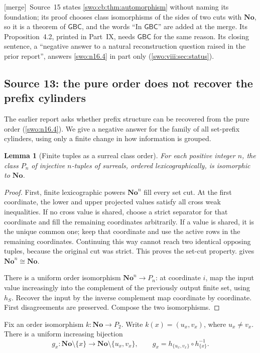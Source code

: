 \documentclass[11pt]{article}
\newtheorem{lemma}[lemma]{Lemma}
\theoremstyle{definition}
\theoremstyle{remark}
\newcommand{\No}{\mathbf{No}}
\newcommand{\GBC}{\mathsf{GBC}}
\newcommand{\merge}{\textsf{[merge]}}
\begin{document}
\merge\ Source~15 states \cref{swo:cb:thm:automorphism} without naming its
foundation; its proof chooses class isomorphisms of the sides of two cuts
with $\No$, so it is a theorem of $\GBC$, and the words ``In $\GBC$'' are
added at the merge. Its Proposition~4.2, printed in Part~IX, needs $\GBC$
for the same reason.
Its closing sentence, a ``negative answer to a natural reconstruction
question raised in the prior report'', answers \cref{swo:n16.4} in part
only (\cref{swo:viii:sec:status}).

\subsection{Source 13: the pure order does not recover the prefix cylinders}\label{swo:fs:sec:automorphisms}

The earlier report asks whether prefix structure can be recovered from
the pure order (\cref{swo:n16.4}). We give a negative answer for the
family of all set-prefix cylinders, using only a finite change in how
information is grouped.

\begin{lemma}[Finite tuples as a surreal class order]\label{swo:fs:lem:tuples}
For each positive integer $n$, the class $P_n$ of injective $n$-tuples
of surreals, ordered lexicographically, is isomorphic to $\No$.
\end{lemma}
\begin{proof}
First, finite lexicographic powers $\No^n$ fill every set cut. At the
first coordinate, the lower and upper projected values satisfy all
cross weak inequalities. If no cross value is shared, choose a strict
separator for that coordinate and fill the remaining coordinates
arbitrarily. If a value is shared, it is the unique common one; keep
that coordinate and use the active rows in the remaining coordinates.
Continuing this way cannot reach two identical opposing tuples,
because the original cut was strict. This proves the set-cut property.
 gives $\No^n\cong\No$.

There is a uniform order isomorphism $\No^n\to P_n$: at coordinate
$i$, map the input value increasingly into the complement of the
previously output finite set, using $h_S$. Recover the input by the
inverse complement map coordinate by coordinate. First disagreements
are preserved. Compose the two isomorphisms.
\end{proof}

Fix an order isomorphism $k:\No\to P_2$. Write
$k(x)=(u_x,v_x)$, where $u_x\ne v_x$. There is a uniform increasing
bijection
\[
 g_x:\No\setminus\{x\}\longrightarrow\No\setminus\{u_x,v_x\},
 \qquad
 g_x=h_{\{u_x,v_x\}}\circ h_{\{x\}}^{-1}.
\]
\end{document}
